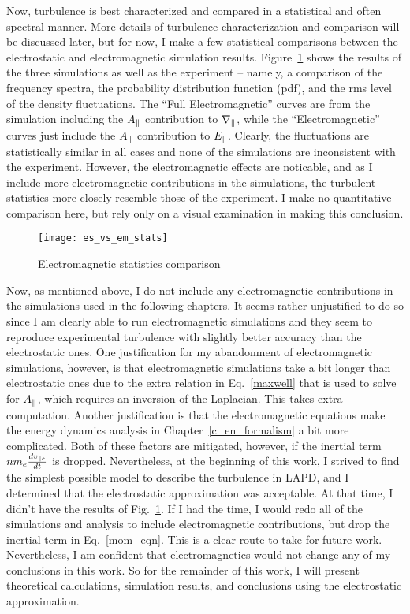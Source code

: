 Now, turbulence is best characterized and compared in a statistical and often spectral manner. 
More details of turbulence characterization and comparison will be discussed later, but for now, I make a few statistical comparisons between the electrostatic and electromagnetic simulation results.
Figure~\ref{es_vs_em_stats} shows the results of the three simulations as well as the experiment
 -- namely, a comparison of the frequency spectra, the probability distribution function (pdf), and the rms level of the density fluctuations. 
The ``Full Electromagnetic'' curves are from the simulation including the $A_\parallel$ contribution to $\nabla_\parallel$, while the ``Electromagnetic'' curves
just include the $A_\parallel$ contribution to $E_\parallel$. 
Clearly, the fluctuations are statistically similar in all cases and none of the simulations are inconsistent with the experiment. 
However, the electromagnetic effects are noticable, and as I include more electromagnetic contributions in the simulations, the turbulent statistics more closely resemble those of the experiment.
I make no quantitative comparison here, but rely only on a visual examination in making this conclusion.

\begin{figure}[ht!]
\texttt{[image: es\_vs\_em\_stats]}
\centering
\caption{Electromagnetic statistics comparison}
\label{es_vs_em_stats}
\end{figure}

Now, as mentioned above, I do not include any electromagnetic contributions in the simulations used in the following chapters. 
It seems rather unjustified to do so since I am clearly able to run electromagnetic simulations and they seem to reproduce experimental turbulence with slightly better accuracy 
than the electrostatic ones.
One justification for my abandonment of electromagnetic simulations, however, is that electromagnetic simulations take a bit longer than electrostatic ones due to the extra relation in Eq.~\ref{maxwell} 
that is used to solve for $A_\parallel$, which requires an inversion of the Laplacian. This takes extra computation. 
Another justification is that the electromagnetic equations make the energy dynamics analysis in Chapter~\ref{c_en_formalism} a bit more complicated. Both of these factors are mitigated, 
however, if the inertial term $n m_e \frac{dv_{\parallel e}}{dt}$ is dropped. Nevertheless, at the beginning of this work, I strived to find the simplest possible model to describe the turbulence in LAPD,
and I determined that the electrostatic approximation was acceptable. At that time, I didn't have the results of Fig.~\ref{es_vs_em_stats}. If I had the time, I would redo all of the simulations
and analysis to include electromagnetic contributions, but drop the inertial term in Eq.~\ref{mom_eqn}. This is a clear route to take for future work. 
Nevertheless, I am confident that electromagnetics would not change any of my conclusions in this work.
So for the remainder of this work, I will present theoretical calculations, simulation results, and conclusions using the electrostatic approximation.
